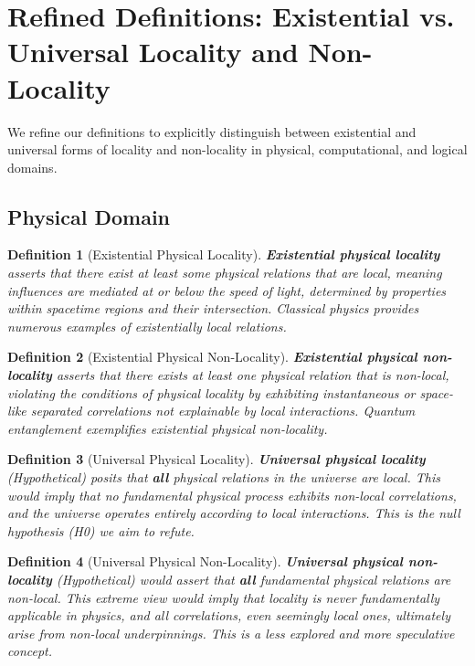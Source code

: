 \documentclass{article}
\newtheorem{definition}{Definition}
\begin{document}
	\section{Refined Definitions: Existential vs. Universal Locality and Non-Locality}
	
	We refine our definitions to explicitly distinguish between existential and universal forms of locality and non-locality in physical, computational, and logical domains.
	
	\subsection{Physical Domain}
	
	\begin{definition}[Existential Physical Locality]
		\textbf{Existential physical locality} asserts that there exist at least some physical relations that are local, meaning influences are mediated at or below the speed of light, determined by properties within spacetime regions and their intersection.  Classical physics provides numerous examples of existentially local relations.
	\end{definition}
	
	\begin{definition}[Existential Physical Non-Locality]
		\textbf{Existential physical non-locality} asserts that there exists at least one physical relation that is non-local, violating the conditions of physical locality by exhibiting instantaneous or space-like separated correlations not explainable by local interactions. Quantum entanglement exemplifies existential physical non-locality.
	\end{definition}
	
	\begin{definition}[Universal Physical Locality]
		\textbf{Universal physical locality} (Hypothetical) posits that \textbf{all} physical relations in the universe are local. This would imply that no fundamental physical process exhibits non-local correlations, and the universe operates entirely according to local interactions. This is the null hypothesis (H0) we aim to refute.
	\end{definition}
	
	\begin{definition}[Universal Physical Non-Locality]
		\textbf{Universal physical non-locality} (Hypothetical) would assert that \textbf{all} fundamental physical relations are non-local. This extreme view would imply that locality is never fundamentally applicable in physics, and all correlations, even seemingly local ones, ultimately arise from non-local underpinnings.  This is a less explored and more speculative concept.
	\end{definition}
	
\end{document}
